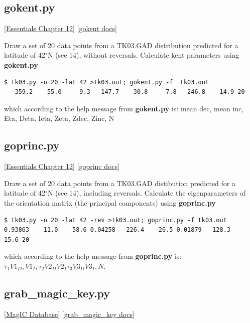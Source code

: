 \documentclass[11pt]{book}
\begin{document}
{{{{%

\subsection{gokent.py}
 \href{http://earthref.org/MAGIC/books/Tauxe/Essentials/WebBook3ch11.html#ch11}{[Essentials Chapter 12]}
 \href{https://github.com/PmagPy/PmagPy/blob/master/programs/gokent.py}{[gokent docs]}

Draw a set of 20 data points  from a TK03.GAD distribution predicted for a latitude of 42$^{\circ}$N (see  14), without  reversals.  Calculate kent parameters using {\bf gokent.py}

\begin{verbatim}
$ tk03.py -n 20 -lat 42 >tk03.out; gokent.py -f  tk03.out
   359.2    55.0     9.3   147.7    30.8     7.8   246.8    14.9 20
\end{verbatim}

\noindent  which according to the help message from {\bf gokent.py} is:   mean dec, mean inc, Eta, Deta, Ieta, Zeta, Zdec, Zinc, N

\subsection{goprinc.py}
 \href{http://earthref.org/MAGIC/books/Tauxe/Essentials/WebBook3ch11.html#ch11}{[Essentials Chapter 12]}
 \href{https://github.com/PmagPy/PmagPy/blob/master/programs/goprinc.py}{[goprinc docs]}

Draw a set of 20 data points  from a TK03.GAD distibution predicted for a latitude of 42$^{\circ}$N (see  14), including reversals.  Calculate the eigenparameters of the orientation matrix (the principal components)  using {\bf goprinc.py}

\begin{verbatim}
$ tk03.py -n 20 -lat 42 -rev >tk03.out; goprinc.py -f tk03.out
0.93863    11.0    58.6 0.04258   226.4    26.5 0.01879   128.3    15.6 20
\end{verbatim}

\noindent  which according to the help message from {\bf goprinc.py} is:    $\tau_1 V1_D, V1_I,  \tau_2 V2_D V2_I \tau_3 V3_D V3_I, N$.

\subsection{grab\_magic\_key.py}
\href{#MagICDatabase}{[MagIC Database]}
\href{https://github.com/PmagPy/PmagPy/blob/master/programs/grab_magic_key.py}{[grab\_magic\_key docs]}

}}}}
\end{document}
